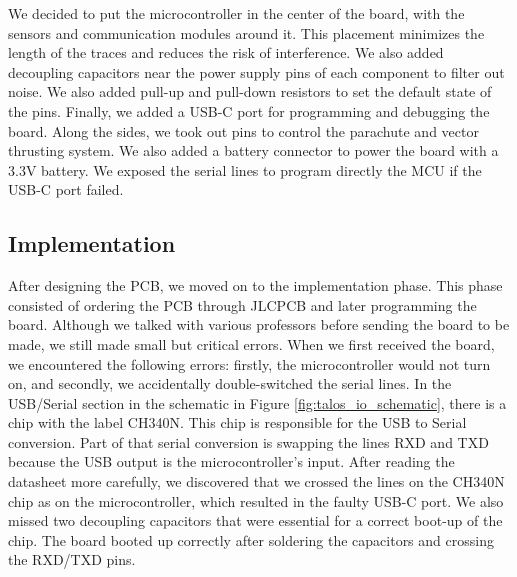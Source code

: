 \documentclass{article}
\begin{document}
We decided to put the microcontroller in the center of the board, with the sensors and communication modules around it. This placement minimizes the length of the traces and reduces the risk of interference. We also added decoupling capacitors near the power supply pins of each component to filter out noise. We also added pull-up and pull-down resistors to set the default state of the pins. Finally, we added a USB-C port for programming and debugging the board. Along the sides, we took out pins to control the parachute and vector thrusting system. We also added a battery connector to power the board with a 3.3V battery. We exposed the serial lines to program directly the MCU if the USB-C port failed.

\subsection{Implementation}
\qquad After designing the PCB, we moved on to the implementation phase. This phase consisted of ordering the PCB through JLCPCB and later programming the board. Although we talked with various professors before sending the board to be made, we still made small but critical errors. When we first received the board, we encountered the following errors: firstly, the microcontroller would not turn on, and secondly, we accidentally double-switched the serial lines. In the USB/Serial section in the schematic in Figure \ref{fig:talos_io_schematic}, there is a chip with the label CH340N. This chip is responsible for the USB to Serial conversion. Part of that serial conversion is swapping the lines RXD and TXD because the USB output is the microcontroller's input. After reading the datasheet more carefully, we discovered that we crossed the lines on the CH340N chip as on the microcontroller, which resulted in the faulty USB-C port. We also missed two decoupling capacitors that were essential for a correct boot-up of the chip. The board booted up correctly after soldering the capacitors and crossing the RXD/TXD pins.
\end{document}
